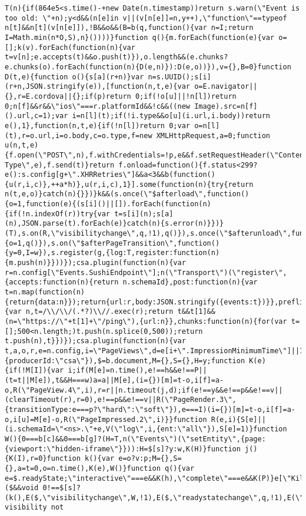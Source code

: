 \documentclass[
]{article}
\begin{document}
\begin{verbatim}
T(n){if(864e5<s.time()-+new Date(n.timestamp))return s.warn(\"Event is too old: \"+n);y<d&&(n[e]in v||(v[n[e]]=n,y++),\"function\"==typeof n[t]&&n[t](v[n[e]]),!B&&o&&(B=b(q,function(){var n=I;return I=Math.min(n*O,S),n}())))}function q(){m.forEach(function(e){var o=[];k(v).forEach(function(n){var t=v[n];e.accepts(t)&&o.push(t)}),o.length&&(e.chunks?e.chunks(o).forEach(function(n){D(e,n)}):D(e,o))}),v={},B=0}function D(t,e){function o(){s[a](r+n)}var n=s.UUID();s[i](r+n,JSON.stringify(e)),[function(n,t,e){var o=E.navigator||{},r=E.cordova||{};if(p)return 0;if(!o[u]||!n[l])return 0;n[f]&&r&&\"ios\"===r.platformId&&!c&&((new Image).src=n[f]().url,c=1);var i=n[l](t);if(!i.type&&o[u](i.url,i.body))return e(),1},function(n,t,e){if(!n[l])return 0;var o=n[l](t),r=o.url,i=o.body,c=o.type,f=new XMLHttpRequest,a=0;function u(n,t,e){f.open(\"POST\",n),f.withCredentials=!p,e&&f.setRequestHeader(\"Content-Type\",e),f.send(t)}return f.onload=function(){f.status<299?e():s.config[g+\".XHRRetries\"]&&a<3&&b(function(){u(r,i,c)},++a*h)},u(r,i,c),1}].some(function(n){try{return n(t,e,o)}catch(n){}})}k&&(s.once(\"$afterload\",function(){o=1,function(e){(s[i]()||[]).forEach(function(n){if(!n.indexOf(r))try{var t=s[i](n);s[a](n),JSON.parse(t).forEach(e)}catch(n){s.error(n)}})}(T),s.on(R,\"visibilitychange\",q,!1),q()}),s.once(\"$afterunload\",function(){o=1,q()}),s.on(\"$afterPageTransition\",function(){y=0,I=w}),s.register(g,{log:T,register:function(n){m.push(n)}}))});csa.plugin(function(n){var r=n.config[\"Events.SushiEndpoint\"];n(\"Transport\")(\"register\",{accepts:function(n){return n.schemaId},post:function(n){var t=n.map(function(n){return{data:n}});return{url:r,body:JSON.stringify({events:t})}},preflight:function(){var n,t=/\\/\\/(.*?)\\//.exec(r);return t&&t[1]&&(n=\"https://\"+t[1]+\"/ping\"),{url:n}},chunks:function(n){for(var t=[];500<n.length;)t.push(n.splice(0,500));return t.push(n),t}})});csa.plugin(function(n){var t,a,o,r,e=n.config,i=\"PageViews\",d=e[i+\".ImpressionMinimumTime\"]||1e3,s=\"hidden\",c=\"innerHeight\",g=\"innerWidth\",l=\"renderedTo\",f=l+\"Viewed\",m=l+\"Meaningful\",u=l+\"Impressed\",p=1,v=2,h=3,w=4,y=5,P=\"loaded\",I=7,T=8,b=n.global,E=n.on,V=n(\"Events\",{producerId:\"csa\"}),$=b.document,M={},S={},H=y;function K(e){if(!M[I]){var i;if(M[e]=n.time(),e!==h&&e!==P||(t=t||M[e]),t&&H===w)a=a||M[e],(i={})[m]=t-o,i[f]=a-o,R(\"PageView.4\",i),r=r||n.timeout(j,d);if(e!==y&&e!==p&&e!==v||(clearTimeout(r),r=0),e!==p&&e!==v||R(\"PageRender.3\",{transitionType:e===p?\"hard\":\"soft\"}),e===I)(i={})[m]=t-o,i[f]=a-o,i[u]=M[e]-o,R(\"PageImpressed.2\",i)}}function R(e,i){S[e]||(i.schemaId=\"<ns>.\"+e,V(\"log\",i,{ent:\"all\"}),S[e]=1)}function W(){0===b[c]&&0===b[g]?(H=T,n(\"Events\")(\"setEntity\",{page:{viewport:\"hidden-iframe\"}})):H=$[s]?y:w,K(H)}function j(){K(I),r=0}function k(){var e=o?v:p;M={},S={},a=t=0,o=n.time(),K(e),W()}function q(){var e=$.readyState;\"interactive\"===e&&K(h),\"complete\"===e&&K(P)}e[\"KillSwitch.\"+i]||($&&void 0!==$[s]?(k(),E($,\"visibilitychange\",W,!1),E($,\"readystatechange\",q,!1),E(\"$afterPageTransition\",k),E(\"$timing:loaded\",q),n.once(\"$load\",q)):n.warn(\"Page visibility not 
\end{verbatim}
\end{document}
